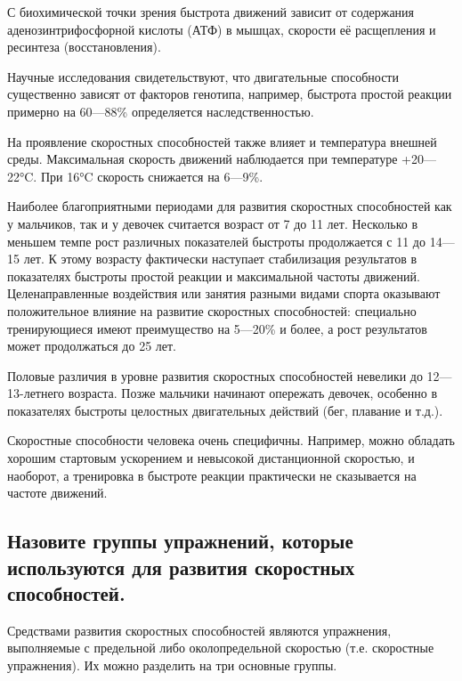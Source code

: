 С биохимической точки зрения быстрота движений зависит от содержания аденозинтрифосфорной кислоты (АТФ) в мышцах, скорости её расщепления и ресинтеза (восстановления).

Научные исследования свидетельствуют, что двигательные способности существенно зависят от факторов генотипа, например, быстрота простой реакции примерно на 60—88\% определяется наследственностью.

На проявление скоростных способностей также влияет и температура внешней среды. Максимальная скорость движений наблюдается при температуре +20—22°C. При 16°C скорость снижается на 6—9\%.

Наиболее благоприятными периодами для развития скоростных способностей как у мальчиков, так и у девочек считается возраст от 7 до 11 лет. Несколько в меньшем темпе рост различных показателей быстроты продолжается с 11 до 14—15 лет. К этому возрасту фактически наступает стабилизация результатов в показателях быстроты простой реакции и максимальной частоты движений. Целенаправленные воздействия или занятия разными видами спорта оказывают положительное влияние на развитие скоростных способностей: специально тренирующиеся имеют преимущество на 5—20\% и более, а рост результатов может продолжаться до 25 лет.

Половые различия в уровне развития скоростных способностей невелики до 12—13-летнего возраста. Позже мальчики начинают опережать девочек, особенно в показателях быстроты целостных двигательных действий (бег, плавание и т.д.).

Скоростные способности человека очень специфичны. Например, можно обладать хорошим стартовым ускорением и невысокой дистанционной скоростью, и наоборот, а тренировка в быстроте реакции практически не сказывается на частоте движений.


\subsection{Назовите группы упражнений, которые используются для развития скоростных способностей.}

Средствами развития скоростных способностей являются упражнения, выполняемые с предельной либо околопредельной скоростью (т.е. скоростные упражнения). Их можно разделить на три основные группы.

